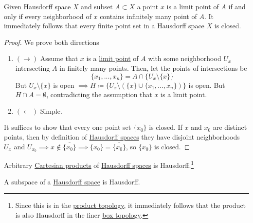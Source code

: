  \begin{theorem}
    \label{thm:limit-points-in-hausdorff-spaces}
    Given \hyperref[def:hausdorff-space]{Hausdorff space} $X$ and subset $A \subset X$ a point $x$ is a \hyperref[def:limit-point]{limit point} of $A$ if and only if every neighborhood of $x$ contains infinitely many point of $A$. It immediately follows that every finite point set in a Hausdorff space $X$ is closed. 
  \end{theorem}
  \begin{proof}
    We prove both directions
    \begin{enumerate}
      \item $(\rightarrow)$ Assume that $x$ is a \hyperref[def:limit-point]{limit point} of $A$ with some neighborhood $U_x$ intersecting $A$ in finitely many points. Then, let the points of intersections be 
      \begin{equation}
        \{x_1, ..., x_n\} = A \cap \{U_x \setminus \{x\} \}
      \end{equation}
      But $U_x \setminus \{x\}$ is open $\implies H \coloneqq \{U_x \setminus ( \{x\} \cup \{x_1, ..., x_n\})\}$ is open. But $H \cap A = \emptyset$, contradicting the assumption that $x$ is a limit point. 

      \item $(\leftarrow)$ Simple. 
    \end{enumerate}
    It suffices to show that every one point set $\{x_0\}$ is closed. If $x$ and $x_0$ are distinct points, then by definition of \hyperref[def:hausdorff-space]{Hausdorff spaces} they have disjoint neighborhoods $U_x$ and $U_{x_0} \implies x \not\in \bar{\{x_0\}} \implies \{x_0\} = \bar{\{x_0\}}$, so $\{x_0\}$ is closed. 
  \end{proof}

  \begin{lemma}
    \label{thm:product-of-hausdorff-spaces}
    Arbitrary \hyperref[st-def:cart-prod-2]{Cartesian products} of \hyperref[def:hausdorff-space]{Hausdorff spaces} is Hausdorff.\footnote{Since this is in the \hyperref[def:product-topology]{product topology}, it immediately follows that the product is also Hausdorff in the finer \hyperref[def:box-topology]{box topology}.}
  \end{lemma}

  \begin{lemma}
    \label{thm:subspaces-of-hausdorff-spaces}
    A subspace of a \hyperref[def:hausdorff-space]{Hausdorff space} is Hausdorff. 
  \end{lemma}


